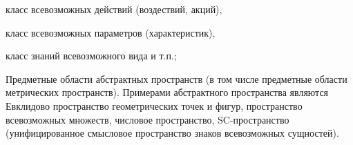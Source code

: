 \begin{SCn}
\begin{scnsubstruct}
\begin{scnsubstruct}
{\begin{scnitemize}
\begin{scnitemizeii}
                        \item класс всевозможных действий (воздествий, акций),
                        \item класс всевозможных параметров (характеристик),
                        \item класс знаний всевозможного вида и т.п.;
                    \end{scnitemizeii}
                    \item Предметные области абстрактных пространств (в том числе предметные области метрических пространств). Примерами абстрактного пространства являются Евклидово пространство геометрических точек и фигур, пространство всевозможных множеств, числовое пространство, SC-пространство (унифицированное смысловое пространство знаков всевозможных сущностей).
                \end{scnitemize}}
            

\end{scnsubstruct}
\end{scnsubstruct}
\end{SCn}
